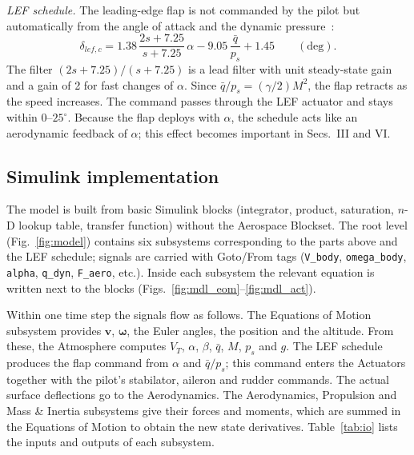 \documentclass[conf]{new-aiaa}
\begin{document}
\emph{LEF schedule.} The leading-edge flap is not commanded by the pilot but automatically from the angle of attack and the dynamic pressure~\cite{slj}:
\begin{equation}
\delta_{lef,c}=1.38\,\frac{2s+7.25}{s+7.25}\,\alpha-9.05\,\frac{\bar q}{p_s}+1.45\qquad(\text{deg}).
\label{eq:lef}
\end{equation}
The filter $(2s+7.25)/(s+7.25)$ is a lead filter with unit steady-state gain and a gain of 2 for fast changes of $\alpha$. Since $\bar q/p_s=(\gamma/2)M^2$, the flap retracts as the speed increases. The command passes through the LEF actuator and stays within $0$--$25^\circ$. Because the flap deploys with $\alpha$, the schedule acts like an aerodynamic feedback of $\alpha$; this effect becomes important in Secs.~III and VI.

\subsection{Simulink implementation}
The model is built from basic Simulink blocks (integrator, product, saturation, $n$-D lookup table, transfer function) without the Aerospace Blockset. The root level (Fig.~\ref{fig:model}) contains six subsystems corresponding to the parts above and the LEF schedule; signals are carried with Goto/From tags (\texttt{V\_body}, \texttt{omega\_body}, \texttt{alpha}, \texttt{q\_dyn}, \texttt{F\_aero}, etc.). Inside each subsystem the relevant equation is written next to the blocks (Figs.~\ref{fig:mdl_eom}--\ref{fig:mdl_act}).

Within one time step the signals flow as follows. The Equations of Motion subsystem provides $\mathbf v$, $\boldsymbol\omega$, the Euler angles, the position and the altitude. From these, the Atmosphere computes $V_T$, $\alpha$, $\beta$, $\bar q$, $M$, $p_s$ and $g$. The LEF schedule produces the flap command from $\alpha$ and $\bar q/p_s$; this command enters the Actuators together with the pilot's stabilator, aileron and rudder commands. The actual surface deflections go to the Aerodynamics. The Aerodynamics, Propulsion and Mass \& Inertia subsystems give their forces and moments, which are summed in the Equations of Motion to obtain the new state derivatives. Table~\ref{tab:io} lists the inputs and outputs of each subsystem.
\end{document}
